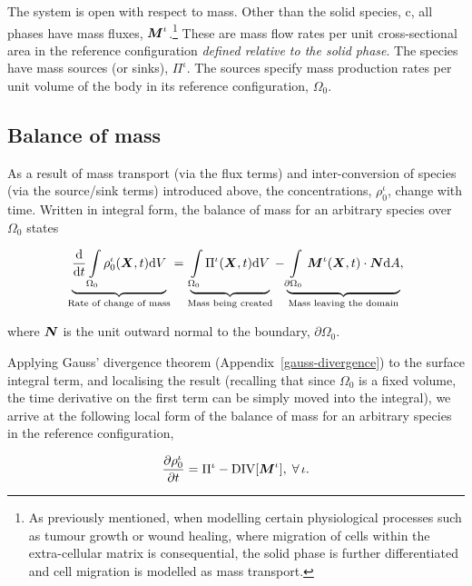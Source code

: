 The system is open with respect to mass. Other than the solid species,
$\mathrm{c}$, all phases have mass fluxes, $\mbox{\boldmath$ M$}^\iota$.\footnote{As
  previously mentioned, when modelling certain physiological processes
  such as tumour growth or wound healing, where migration of cells
  within the extra-cellular matrix is consequential, the solid phase
  is further differentiated and cell migration is modelled as mass
  transport.}  These are mass flow rates per unit cross-sectional area
in the reference configuration \emph{defined relative to the solid
  phase}. The species have mass sources (or sinks), $\Pi^\iota$. The
sources specify mass production rates per unit volume of the body in
its reference configuration, $\Omega_0$.

\subsection{Balance of mass}
\label{balance-of-mass}

As a result of mass transport (via the flux terms) and
inter-conversion of species (via the source/sink terms) introduced
above, the concentrations, $\rho_0^\iota$, change with
time. Written in integral form, the balance of mass for an arbitrary
species over $\Omega_0$ states

\begin{equation}
\underbrace{\frac{\mathrm{d}}{\mathrm{d}t} \int\limits_{\Omega_0}
  \rho_0^\iota 
(\mbox{\boldmath$ X$},t)\mathrm{d}V}_{\text{Rate of change of mass}} =
\underbrace{\int\limits_{\Omega_0} \Pi^\iota
  (\mbox{\boldmath$ X$},t)\mathrm{d}V}_{\text{Mass being created}}
-\underbrace{\int\limits_{\partial\Omega_0}\mbox{\boldmath$ M$}^\iota(\mbox{\boldmath$ X$},t)\cdot\mbox{\boldmath$ N$}
  \mathrm{d}A}_{\text{Mass leaving the domain}}, 
\label{globalbalanceofmass}
\end{equation}

\noindent where $\mbox{\boldmath$ N$}$ is the unit outward normal to the boundary,
$\partial\Omega_0$.

 Applying Gauss' divergence theorem
(Appendix~\ref{gauss-divergence}) to the surface integral term, and
localising the result (recalling that since $\Omega_0$ is a fixed
volume, the time derivative on the first term can be simply moved into
the integral), we arrive at the following local form of the balance of
mass for an arbitrary species in the reference configuration,

\begin{equation}
\frac{\partial\rho_0^\iota}{\partial t} = \Pi^\iota -
\mathrm{DIV}[\mbox{\boldmath$ M$}^\iota],\;\forall\,\iota.
\label{localbalanceofmass}
\end{equation}

